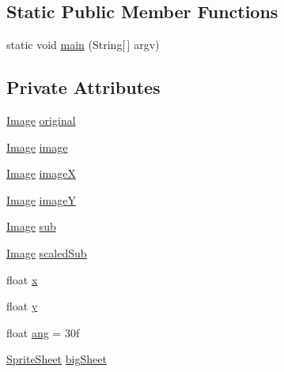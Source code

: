 \subsection*{Static Public Member Functions}
\begin{DoxyCompactItemize}
\item 
static void \mbox{\hyperlink{classorg_1_1newdawn_1_1slick_1_1tests_1_1_big_image_test_a5646f5aa04e69e9dec99dd1f9b603262}{main}} (String\mbox{[}$\,$\mbox{]} argv)
\end{DoxyCompactItemize}
\subsection*{Private Attributes}
\begin{DoxyCompactItemize}
\item 
\mbox{\hyperlink{classorg_1_1newdawn_1_1slick_1_1_image}{Image}} \mbox{\hyperlink{classorg_1_1newdawn_1_1slick_1_1tests_1_1_big_image_test_adb1c4df95c53553a6de413a48d245909}{original}}
\item 
\mbox{\hyperlink{classorg_1_1newdawn_1_1slick_1_1_image}{Image}} \mbox{\hyperlink{classorg_1_1newdawn_1_1slick_1_1tests_1_1_big_image_test_a44a155047126b4dcff68f76170ad259d}{image}}
\item 
\mbox{\hyperlink{classorg_1_1newdawn_1_1slick_1_1_image}{Image}} \mbox{\hyperlink{classorg_1_1newdawn_1_1slick_1_1tests_1_1_big_image_test_a149735477376cc13498b7d1d5cddc215}{imageX}}
\item 
\mbox{\hyperlink{classorg_1_1newdawn_1_1slick_1_1_image}{Image}} \mbox{\hyperlink{classorg_1_1newdawn_1_1slick_1_1tests_1_1_big_image_test_a988ec4960120c9648d70567f391fc19a}{imageY}}
\item 
\mbox{\hyperlink{classorg_1_1newdawn_1_1slick_1_1_image}{Image}} \mbox{\hyperlink{classorg_1_1newdawn_1_1slick_1_1tests_1_1_big_image_test_a831175a13c7925f1c7df5819299fcc4a}{sub}}
\item 
\mbox{\hyperlink{classorg_1_1newdawn_1_1slick_1_1_image}{Image}} \mbox{\hyperlink{classorg_1_1newdawn_1_1slick_1_1tests_1_1_big_image_test_adca40be3d5cff8a07630a0eb9173db6c}{scaled\+Sub}}
\item 
float \mbox{\hyperlink{classorg_1_1newdawn_1_1slick_1_1tests_1_1_big_image_test_a6f555917c3173ff62aac2bde25393e95}{x}}
\item 
float \mbox{\hyperlink{classorg_1_1newdawn_1_1slick_1_1tests_1_1_big_image_test_a423ca36ec29a719e670e143236347c77}{y}}
\item 
float \mbox{\hyperlink{classorg_1_1newdawn_1_1slick_1_1tests_1_1_big_image_test_a594a1221b0db224feb5cca1aa62a81a7}{ang}} = 30f
\item 
\mbox{\hyperlink{classorg_1_1newdawn_1_1slick_1_1_sprite_sheet}{Sprite\+Sheet}} \mbox{\hyperlink{classorg_1_1newdawn_1_1slick_1_1tests_1_1_big_image_test_a7c9bcf0eea233f19341717b10fcf949b}{big\+Sheet}}
\end{DoxyCompactItemize}
